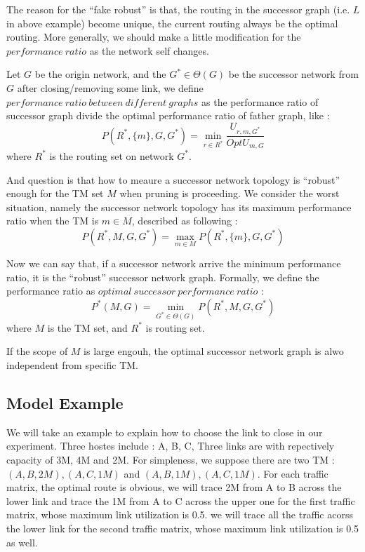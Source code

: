 \documentclass[conference]{IEEEtran}
\begin{document}
The reason for the ``fake robust'' is that, the routing in the successor graph (i.e. $L$ in above example) become 
unique, the current routing always be the optimal routing. More generally, we should make a little modification
for the $performance\ ratio$ as the network self changes.

Let $G$ be the origin network, and the $G^* \in \Theta(G)$ be the successor network from $G$ after closing/removing
some link, we define $performance\ ratio\ between\ different\ graphs$ as the performance ratio of successor graph divide 
the optimal performance ratio of father graph, like :
\begin{equation}
	P(R^*, \{ m\}, G, G^*) = \min_{r \in R^*} \frac{U_{r,m,G^*}}{OptU_{m,G}}
\end{equation}
where $R^*$ is the routing set on network $G^*$.

And question is that how to meaure a successor network topology is ``robust'' enough for the TM set $M$ when 
pruning is proceeding. We consider the worst situation, namely the successor network topology has its maximum
performance ratio when the TM is $m \in M$, described as following :
\begin{equation}
	P(R^*, M, G, G^*) = \max_{m \in M} P(R^*, \{ m \}, G, G^*)
\end{equation}

Now we can say that, if a successor network arrive the minimum performance ratio, it is the ``robust'' successor 
network graph. Formally, we define the performance ratio as $optimal\ successor\ performance\ ratio$ :
\begin{equation}
	P^{*}(M, G) = \min_{G^* \in \Theta(G)} P(R^*, M, G, G^*)
\end{equation}
where $M$ is the TM set, and $R^*$ is routing set. 

If the scope of $M$ is large engouh, the optimal successor network graph is alwo independent from specific TM. 

\subsection{Model Example}
We will take an example to explain how to choose the link to close in our experiment.
Three hostes include : A, B, C, Three links are with repectively capacity of 3M, 4M and 2M. For simpleness, we suppose 
there are two TM : ${(A,B,2M), (A,C,1M)}$ and ${(A,B,1M), (A,C,1M)}$. For each traffic matrix, the optimal route is 
obvious, we will trace 2M from A to B across the lower link and trace the 1M from A to C across the upper one 
for the first traffic matrix, whose maximum link utilization is 0.5. we will trace all the traffic acorss the
lower link for the second traffic matrix, whose maximum link utilization is 0.5 as well.
\end{document}
